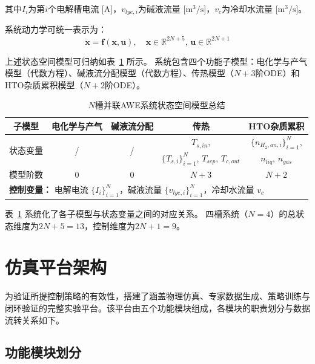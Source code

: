 其中$I_i$为第$i$个电解槽电流 [A]，$v_{lye,i}$为碱液流量 [$\mathrm{m}^3/\mathrm{s}$]，$v_c$为冷却水流量 [$\mathrm{m}^3/\mathrm{s}$]。

系统动力学可统一表示为：
\begin{equation}
  \dot{\mathbf{x}} = \mathbf{f}(\mathbf{x}, \mathbf{u}), \quad \mathbf{x} \in \mathbb{R}^{2N+5}, \, \mathbf{u} \in \mathbb{R}^{2N+1}
\end{equation}

上述状态空间模型可归纳如表~\ref{tab:state_space_summary} 所示。
系统包含四个功能子模型：电化学与产气模型（代数方程）、碱液流分配模型（代数方程）、传热模型（$N+3$阶ODE）和HTO杂质累积模型（$N+2$阶ODE）。

\begin{table}[!htbp]
  \centering
  \caption{$N$槽并联AWE系统状态空间模型总结}
  \label{tab:state_space_summary}
  \small
  \begin{tabular}{@{}c c c c c@{}}
    \toprule
    \textbf{子模型} & \textbf{电化学与产气} & \textbf{碱液流分配} & \textbf{传热} & \textbf{HTO杂质累积} \\
    \midrule
    \multirow{2}{*}{状态变量} & \multirow{2}{*}{/} & \multirow{2}{*}{/} & $T_{s,in}$, & $\{n_{H_2,an,i}\}_{i=1}^N$, \\
    & & & $\{T_{s,i}\}_{i=1}^N$, $T_{sep}$, $T_{c,out}$ & $n_{liq}$, $n_{gas}$ \\
    \addlinespace
    模型阶数 & 0 & 0 & $N+3$ & $N+2$ \\
    \midrule
    \multicolumn{5}{l}{\textbf{控制变量：} 电解电流 $\{I_i\}_{i=1}^N$，碱液流量 $\{v_{lye,i}\}_{i=1}^N$，冷却水流量 $v_c$} \\
    \bottomrule
  \end{tabular}
\end{table}

表~\ref{tab:state_space_summary} 系统化了各子模型与状态变量之间的对应关系。
四槽系统（$N=4$）的总状态维度为$2N+5=13$，控制维度为$2N+1=9$。

\section{仿真平台架构}

为验证所提控制策略的有效性，搭建了涵盖物理仿真、专家数据生成、策略训练与闭环验证的完整实验平台。该平台由五个功能模块组成，各模块的职责划分与数据流转关系如下。

\subsection{功能模块划分}

